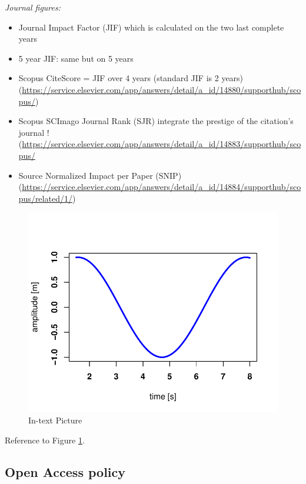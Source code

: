 \documentclass[fleqn,10pt,lineno]{wlpeerj} %
\providecommand{\tightlist}{
\setlength{\itemsep}{0pt}\setlength{\parskip}{0pt}}
\begin{document}
\emph{Journal figures:}

\begin{itemize}
\tightlist
\item
  Journal Impact Factor (JIF) which is calculated on the two last complete years\\
\item
  5 year JIF: same but on 5 years
\item
  Scopus CiteScore = JIF over 4 years (standard JIF is 2 years) (\url{https://service.elsevier.com/app/answers/detail/a_id/14880/supporthub/scopus/})
\item
  Scopus SCImago Journal Rank (SJR) integrate the prestige of the citation's journal ! (\url{https://service.elsevier.com/app/answers/detail/a_id/14883/supporthub/scopus/}
\item
  Source Normalized Impact per Paper (SNIP) (\url{https://service.elsevier.com/app/answers/detail/a_id/14884/supporthub/scopus/related/1/})
\end{itemize}

\begin{figure}
\includegraphics[width=1\linewidth]{OA_Archaeo_files/figure-latex/results-1} \caption{In-text Picture}\label{fig:results}
\end{figure}

Reference to Figure \ref{fig:results}.

\hypertarget{open-access-policy}{%
\subsection*{Open Access policy}\label{open-access-policy}}
\end{document}
